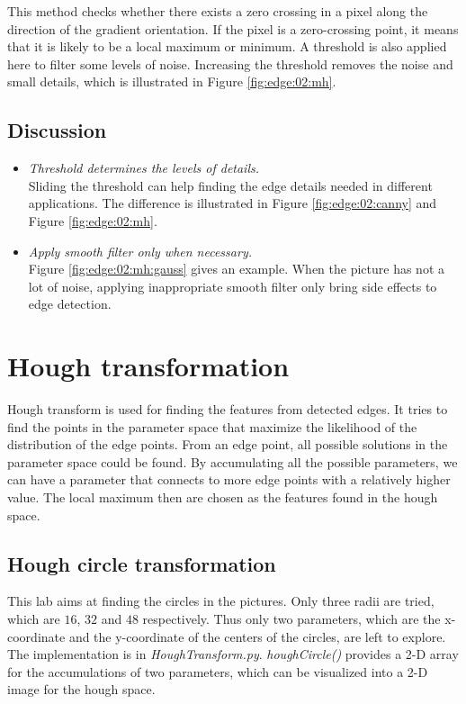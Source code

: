 \documentclass[paper=a4, fontsize=11pt]{scrartcl}
\begin{document}
This method checks whether there exists a zero crossing in a pixel along the direction of the gradient orientation.
If the pixel is a zero-crossing point, it means that it is likely to be a local maximum or minimum. 
A threshold is also applied here to filter some levels of noise.
Increasing the threshold removes the noise and small details, which is illustrated in Figure \ref{fig:edge:02:mh}.

\subsection{Discussion}

\begin{itemize}
\item \emph{Threshold determines the levels of details.} \\
Sliding the threshold can help finding the edge details needed in different applications.
The difference is illustrated in Figure \ref{fig:edge:02:canny} and Figure \ref{fig:edge:02:mh}.
\item \emph{Apply smooth filter only when necessary. } \\
Figure \ref{fig:edge:02:mh:gauss} gives an example.
When the picture has not a lot of noise, applying inappropriate smooth filter only bring side effects to edge detection.
\end{itemize}

\section{Hough transformation}

Hough transform is used for finding the features from detected edges.
It tries to find the points in the parameter space that maximize the likelihood of the distribution of the edge points.
From an edge point, all possible solutions in the parameter space could be found.
By accumulating all the possible parameters, we can have a parameter that connects to more edge points with a relatively higher value.
The local maximum then are chosen as the features found in the hough space.

\subsection{Hough circle transformation}

This lab aims at finding the circles in the pictures. 
Only three radii are tried, which are $ 16 $, $ 32 $ and $ 48 $ respectively.
Thus only two parameters, which are the x-coordinate and the y-coordinate of the centers of the circles, are left to explore.
The implementation is in \emph{HoughTransform.py}.
\emph{houghCircle()} provides a 2-D array for the accumulations of two parameters, which can be visualized into a 2-D image for the hough space.
\end{document}
